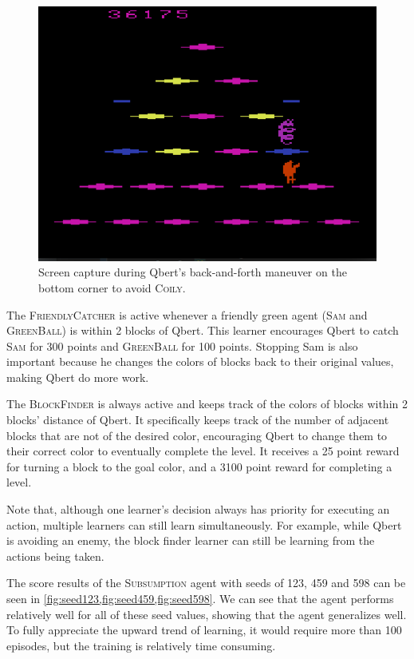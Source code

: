 \documentclass[a4paper,titlepage]{article}
\begin{document}
	\begin{figure}[!htb]
		\centering
		\includegraphics[width=\columnwidth]{screenshots/avoid_coily.png}
		\caption
		{Screen capture during Qbert's back-and-forth maneuver on the bottom corner to avoid \textsc{Coily}.}
		\label{fig:avoid_coily}
	\end{figure}
	
	The \textsc{FriendlyCatcher} is active whenever a friendly green agent (\textsc{Sam} and \textsc{GreenBall}) is within 2 blocks of Qbert. This learner encourages Qbert to catch \textsc{Sam} for 300 points and \textsc{GreenBall} for 100 points. Stopping Sam is also important because he changes the colors of blocks back to their original values, making Qbert do more work.
	
	The \textsc{BlockFinder} is always active and keeps track of the colors of blocks within 2 blocks' distance of Qbert. It specifically keeps track of the number of adjacent blocks that are not of the desired color, encouraging Qbert to change them to their correct color to eventually complete the level. It receives a 25 point reward for turning a block to the goal color, and a 3100 point reward for completing a level.
	
	Note that, although one learner's decision always has priority for executing an action, multiple learners can still learn simultaneously. For example, while Qbert is avoiding an enemy, the block finder learner can still be learning from the actions being taken.
	
	The score results of the \textsc{Subsumption} agent with seeds of 123, 459 and 598 can be seen in \cref{fig:seed123,fig:seed459,fig:seed598}. We can see that the agent performs relatively well for all of these seed values, showing that the agent generalizes well. To fully appreciate the upward trend of learning, it would require more than 100 episodes, but the training is relatively time consuming.
	
\end{document}
